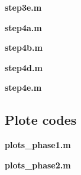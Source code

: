 \textbf{step3e.m}


\bigskip
\bigskip

\textbf{step4a.m}


\bigskip
\bigskip

\textbf{step4b.m}


\newpage

\textbf{step4d.m}


\newpage

\textbf{step4e.m}


\newpage

\subsection{Plote codes}

\textbf{plots\_phase1.m}


\newpage

\textbf{plots\_phase2.m}



